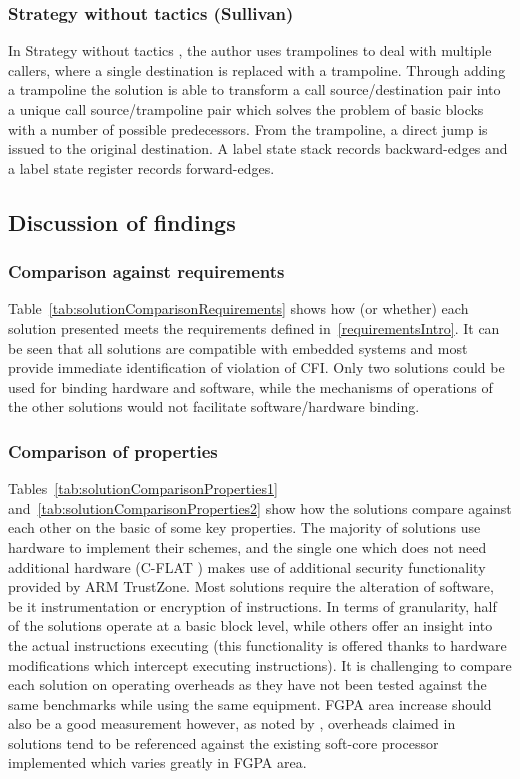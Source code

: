 \subsubsection*{Strategy without tactics (Sullivan)}
In Strategy without tactics \cite{Davi2015}, the author uses trampolines to deal with multiple callers, where a single destination is replaced with a trampoline. Through adding a trampoline the solution is able to transform a call source\slash destination pair into a unique call source\slash trampoline pair which solves the problem of basic blocks with a number of possible predecessors. From the trampoline, a direct jump is issued to the original destination. A label state stack records backward-edges and a label state register records forward-edges. 

\subsection{Discussion of findings}
\subsubsection*{Comparison against requirements}

Table~\ref{tab:solutionComparisonRequirements} shows how (or whether) each solution presented meets the requirements defined in~\ref{requirementsIntro}. It can be seen that all solutions are compatible with embedded systems and most provide immediate identification of violation of CFI. Only two solutions could be used for binding hardware and software, while the mechanisms of operations of the other solutions would not facilitate software\slash hardware binding.

\subsubsection*{Comparison of properties}


Tables~\ref{tab:solutionComparisonProperties1} and~\ref{tab:solutionComparisonProperties2} show how the solutions compare against each other on the basic of some key properties. The majority of solutions use hardware to implement their schemes, and the single one which does not need additional hardware (C-FLAT \cite{Abera2016}) makes use of additional security functionality provided by ARM TrustZone. Most solutions require the alteration of software, be it instrumentation or encryption of instructions. In terms of granularity, half of the solutions operate at a basic block level, while others offer an insight into the actual instructions executing (this functionality is offered thanks to hardware modifications which intercept executing instructions). It is challenging to compare each solution on operating overheads as they have not been tested against the same benchmarks while using the same equipment. FGPA area increase should also be a good measurement however, as noted by \cite{DeClercq2017}, overheads claimed in solutions tend to be referenced against the existing soft-core processor implemented which varies greatly in FGPA area.



